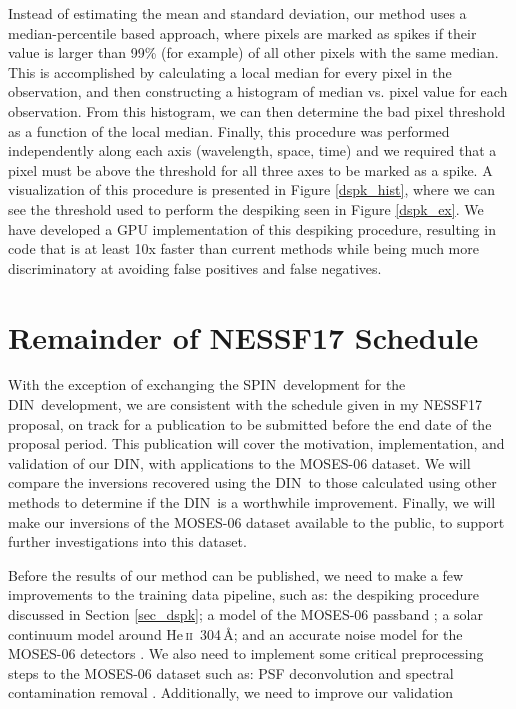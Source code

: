 \documentclass[10pt,letterpaper, doublespace]{article}
\newcommand{\HeII}{He\,\textsc{ii}~304\,\AA}
\newcommand{\MOSES}{\ac{MOSES}}
\newcommand{\DIN}{\ac{DIN}}
\newcommand{\SPIN}{\ac{SPIN}}
\begin{document}
			Instead of estimating the mean and standard deviation, our method uses a median-percentile based approach, where pixels are marked as spikes if their value is larger than 99\% (for example) of all other pixels with the same median. 
			This is accomplished by calculating a local median for every pixel in the observation, and then constructing a histogram of median vs. pixel value for each observation.
			From this histogram, we can then determine the bad pixel threshold as a function of the local median.
			Finally, this procedure was performed independently along each axis (wavelength, space, time) and we required that a pixel must be above the threshold for all three axes to be marked as a spike.
			A visualization of this procedure is presented in Figure \ref{dspk_hist}, where we can see the threshold used to perform the despiking seen in Figure \ref{dspk_ex}.		
			We have developed a GPU implementation of this despiking procedure, resulting in code that is at least 10x faster than current methods while being much more discriminatory at avoiding false positives and false negatives.

		
	\section{Remainder of NESSF17 Schedule}
	
		With the exception of exchanging the \SPIN\ development for the \DIN\ development, we are consistent with the schedule given in my NESSF17 proposal, on track for a publication to be submitted before the end date of the proposal period.
		This publication will cover the motivation, implementation, and validation of our \DIN, with applications to the \MOSES-06 dataset.
		We will compare the inversions recovered using the \DIN\ to those calculated using other methods to determine if the \DIN\ is a worthwhile improvement.
		Finally, we will make our inversions of the \MOSES-06 dataset available to the public, to support further investigations into this dataset.
		
		Before the results of our method can be published, we need to make a few improvements to the training data pipeline, such as: the despiking procedure discussed in Section \ref{sec_dspk}; a model of the \MOSES-06 passband \citep{Fox2011}; a solar continuum model around \HeII \citep{Fox2011}; and an accurate noise model for the \MOSES-06 detectors \cite{Rust2017}.
		We also need to implement some critical preprocessing steps to the \MOSES-06 dataset such as: PSF deconvolution \citep{Rust2017} and spectral contamination removal \citep{Parker2016}.
		Additionally, we need to improve our validation 
	
\end{document}
